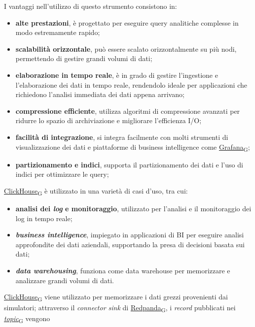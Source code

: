 I vantaggi nell'utilizzo di questo strumento consistono in:
\begin{itemize}
	\item \textbf{alte prestazioni}, è progettato per eseguire query analitiche complesse in modo estremamente rapido;
	\item \textbf{scalabilità orizzontale}, può essere scalato orizzontalmente su più nodi, permettendo di gestire grandi volumi di dati;
	\item \textbf{elaborazione in tempo reale}, è in grado di gestire l'ingestione e l'elaborazione dei dati in tempo reale, rendendolo ideale per applicazioni che richiedono l'analisi immediata dei dati appena arrivano;
	\item \textbf{compressione efficiente}, utilizza algoritmi di compressione avanzati per ridurre lo spazio di archiviazione e migliorare l'efficienza I/O;
	\item \textbf{facilità di integrazione}, si integra facilmente con molti strumenti di visualizzazione dei dati e piattaforme di business intelligence come \href{https://7last.github.io/docs/pb/documentazione-interna/glossario\#grafana}{Grafana\textsubscript{G}};
	\item \textbf{partizionamento e indici}, supporta il partizionamento dei dati e l'uso di indici per ottimizzare le query;
\end{itemize}
\href{https://7last.github.io/docs/pb/documentazione-interna/glossario\#clickhouse}{ClickHouse\textsubscript{G}} è utilizzato in una varietà di casi d'uso, tra cui:
\begin{itemize}
	\item \textbf{analisi dei \textit{log} e monitoraggio}, utilizzato per l'analisi e il monitoraggio dei log in tempo reale;
	\item \textbf{\textit{business intelligence}}, impiegato in applicazioni di BI per eseguire analisi approfondite dei dati aziendali, supportando la presa di decisioni basata sui dati;
	\item \textbf{\textit{data warehousing}}, funziona come data warehouse per memorizzare e analizzare grandi volumi di dati.
\end{itemize}
\href{https://7last.github.io/docs/pb/documentazione-interna/glossario\#clickhouse}{ClickHouse\textsubscript{G}} viene utilizzato per memorizzare i dati grezzi provenienti dai simulatori; attraverso il \textit{connector sink} di \href{https://7last.github.io/docs/pb/documentazione-interna/glossario\#redpanda}{Redpanda\textsubscript{G}}, i \textit{record} pubblicati nei \href{https://7last.github.io/docs/pb/documentazione-interna/glossario\#topic}{\textit{topic}\textsubscript{G}} vengono

